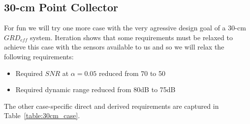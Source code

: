\documentclass[10pt,journal]{IEEEtran}  %
\begin{document}
\begin{table}[h!]
\centering
{}
\caption{Dependent system parameters for optimized 1-m system}
\label{table:1m_parameters}
\end{table}

\subsection{30-cm Point Collector} 

For fun we will try one more case with the very agressive design goal of a 30-cm $GRD_{eff}$ system.  Iteration shows that some requirements must be relaxed to achieve this case with the sensors available to us and so we will relax the following requirements:
\begin{itemize}
\item Required $SNR$ at $\alpha = 0.05$ reduced from 70 to 50
\item Required dynamic range reduced from 80dB to 75dB
\end{itemize}

The other case-specific direct and derived requirements are captured in Table~\ref{table:30cm_case}. 
\end{document}
